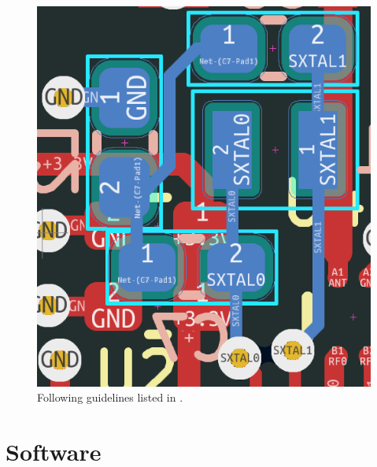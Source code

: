 \documentclass[12pt,journal,onecolumn,draftclsnofoot]{IEEEtran}
\begin{document}
\begin{figure}[H]
\centering
\includegraphics[]{Pics/osc.png}
\caption{Following guidelines listed in \cite{an2867}.} 
\label{fig:osc}
\end{figure}

\section{Software}
\end{document}
